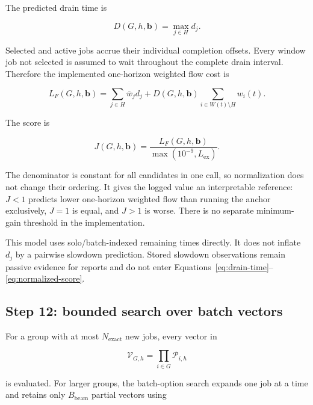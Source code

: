 \documentclass[11pt]{article}
\begin{document}
The predicted drain time is

\begin{equation}
  D(G,h,\boldsymbol b)=\max_{j\in H}d_j.
  \label{eq:drain-time}
\end{equation}

Selected and active jobs accrue their individual completion offsets.  Every
window job not selected is assumed to wait throughout the complete drain
interval.  Therefore the implemented one-horizon weighted flow cost is

\begin{equation}
  L_F(G,h,\boldsymbol b)
  =\sum_{j\in H}\bar w_j d_j
   +D(G,h,\boldsymbol b)
      \sum_{i\in W(t)\setminus H}w_i(t).
  \label{eq:flow-cost}
\end{equation}

The score is

\begin{equation}
  J(G,h,\boldsymbol b)
  =\frac{L_F(G,h,\boldsymbol b)}{\max(10^{-9},L_{\mathrm{ex}})}.
  \label{eq:normalized-score}
\end{equation}

The denominator is constant for all candidates in one call, so normalization
does not change their ordering.  It gives the logged value an interpretable
reference: $J<1$ predicts lower one-horizon weighted flow than running the
anchor exclusively, $J=1$ is equal, and $J>1$ is worse.  There is no separate
minimum-gain threshold in the implementation.

This model uses solo/batch-indexed remaining times directly.  It does not inflate
$d_j$ by a pairwise slowdown prediction.  Stored slowdown observations remain
passive evidence for reports and do not enter Equations~\eqref{eq:drain-time}--
\eqref{eq:normalized-score}.

\subsection{Step 12: bounded search over batch vectors}

For a group with at most $N_{\mathrm{exact}}$ new jobs, every vector in

\begin{equation}
  \mathcal V_{G,h}=\prod_{i\in G}\mathcal P_{i,h}
\end{equation}

is evaluated.  For larger groups, the batch-option search expands one job at a
time and retains only $B_{\mathrm{beam}}$ partial vectors using
\end{document}
